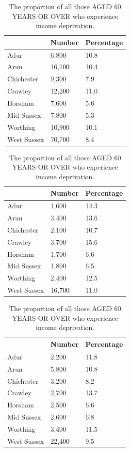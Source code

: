 \begin{table}[H]
    \caption{The proportion of the TOTAL POPULATION experiencing deprivation relating to low income.}\label{tab:incomedep:popn}
    \centering
    \begin{tabular}{lll}
    \toprule
    \ & Number & Percentage \\
    \midrule
    Adur & 6,800 & 10.8 \\
    Arun & 16,100 & 10.4 \\
    Chichester & 9,300 & 7.9 \\
    Crawley & 12,200 & 11.0 \\
    Horsham & 7,600 & 5.6 \\
    Mid Sussex & 7,800 & 5.3 \\
    Worthing & 10,900 & 10.1 \\
    West Sussex & 70,700 & 8.4 \\
    \bottomrule
    \end{tabular}
    \bigskip
    \caption{The proportion of the CHILDREN AGED 0-15 YEARS in income deprived families.}\label{tab:incomedep:kids}
    \centering
    \begin{tabular}{lll}
    \toprule
    \ & Number & Percentage \\
    \midrule
    Adur & 1,600 & 14.3 \\
    Arun & 3,400 & 13.6 \\
    Chichester & 2,100 & 10.7 \\
    Crawley & 3,700 & 15.6 \\
    Horsham & 1,700 & 6.6 \\
    Mid Sussex & 1,800 & 6.5 \\
    Worthing & 2,400 & 12.5 \\
    West Sussex & 16,700 & 11.0 \\
    \bottomrule
    \end{tabular}
    \bigskip
    \caption{The proportion of all those AGED 60 YEARS OR OVER who experience income deprivation.}\label{tab:incomedep:oaps}
    \centering
    \begin{tabular}{lll}
    \toprule
    \ & Number & Percentage \\
    \midrule
    Adur & 2,200 & 11.8 \\
    Arun & 5,800 & 10.8 \\
    Chichester & 3,200 & 8.2 \\
    Crawley & 2,700 & 13.7 \\
    Horsham & 2,500 & 6.6 \\
    Mid Sussex & 2,600 & 6.8 \\
    Worthing & 3,400 & 11.5 \\
    West Sussex & 22,400 & 9.5 \\
    \bottomrule
    \end{tabular}
\end{table}


